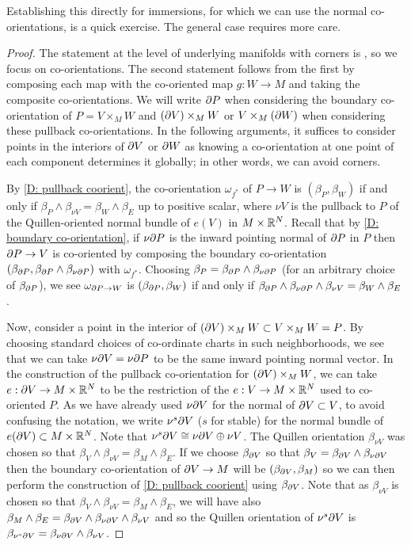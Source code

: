 Establishing this directly for immersions, for which we can use the  normal co-orientations, is a quick exercise.  The general case requires more care.

\begin{proof}
The statement at the level of underlying manifolds with corners is \cite[Proposition 6.7]{Joy12}, so we focus on co-orientations. The second statement follows from the first by composing each map with the co-oriented map $g:W\to M$ and taking the composite co-orientations.  We will write $\partial P$ when considering the boundary co-orientation of $P=V\times_M W$ and $(\partial V)\times_M W$ or $V\times_M (\partial W)$ when considering these pullback co-orientations. In the following arguments, it suffices to consider points in the interiors of $\partial V$ or $\partial W$ as knowing a co-orientation at one point of each component determines it globally; in other words, we can avoid corners.

By \cref{D: pullback coorient}, the co-orientation $\omega_{f^*}$ of $P\to W$ is $(\beta_P,\beta_W)$ if and only if $\beta_P\wedge \beta_{\nu V}=\beta_W\wedge \beta_E$ up to positive scalar, where $\nu V$ is the pullback to $P$ of the Quillen-oriented normal bundle of $e(V)$ in $M\times \mathbb{R}^N$. Recall that by \cref{D: boundary co-orientation}, if $\nu \partial P$ is the inward pointing normal of $\partial P$ in $P$ then $\partial P\to V$ is co-oriented  by composing the boundary co-orientation $(\beta_{\partial P},\beta_{\partial P}\wedge \beta_{\nu \partial P})$ with $\omega_{f^*}$. Choosing $\beta_P= \beta_{\partial P}\wedge \beta_{\nu \partial P}$ (for an arbitrary choice of $\beta_{\partial P}$), we see $\omega_{\partial P\to W}$ is $(\beta_{\partial P},\beta_W)$ if and only if  $\beta_{\partial P}\wedge \beta_{\nu\partial P}\wedge \beta_{\nu V}=\beta_W\wedge \beta_E$.

Now, consider a point in the interior of $(\partial V)\times_MW\subset V\times_MW=P$. By choosing standard choices of co-ordinate charts in such neighborhoods, we see that we can take $\nu\partial V=\nu \partial P$ to be the same inward pointing normal vector.
In the construction of the pullback co-orientation for $(\partial V)\times_M W$, we can take $e:\partial V\to M\times \mathbb{R}^N$ to be the restriction of the $e:V\to M\times \mathbb{R}^N$ used to co-oriented $P$. As we have already used $\nu \partial V$ for the normal of $\partial V\subset V$, to avoid confusing the notation, we write $\nu^s\partial V$ ($s$ for stable) for the normal bundle of $e(\partial V)\subset M\times \mathbb{R}^N$. Note that $\nu^s\partial V\cong \nu\partial V\oplus \nu V$. The Quillen orientation $\beta_{\nu V}$ was chosen so that $\beta_V\wedge \beta_{\nu V}=\beta_{M}\wedge \beta_E$. If we choose $\beta_{\partial V}$ so that $\beta_V=\beta_{\partial V}\wedge \beta_{\nu\partial V}$ then the boundary co-orientation of $\partial V\to M$ will be $(\beta_{\partial V},\beta_M)$ so we can then perform the construction of \cref{D: pullback coorient} using $\beta_{\partial V}$. Note that as $\beta_{\nu V}$ is chosen so that $\beta_V\wedge \beta_{\nu V}=\beta_M\wedge \beta_E$, we will have also  $\beta_M\wedge \beta_E=\beta_{\partial V}\wedge \beta_{\nu\partial V}\wedge \beta_{\nu V}$ and so the Quillen orientation of $\nu^s\partial V$ is  $\beta_{\nu^s\partial V}=\beta_{\nu\partial V}\wedge \beta_{\nu V}$.


\end{proof}
